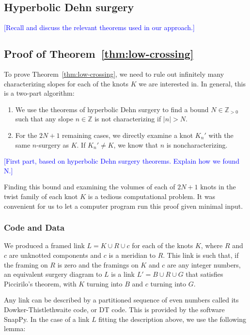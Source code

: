 \documentclass[11pt,usenames,dvipsnames,reqno]{amsart}
\newcommand{\zz}{\mathbb{Z}}
\numberwithin{theorem}{section}
\theoremstyle{ex}
\theoremstyle{rem}
\def\kh#1{\textcolor{Blue}{#1}}
\begin{document}
\subsection{Hyperbolic Dehn surgery} \kh{[Recall and discuss the relevant theorems used in our approach.]}

\subsection{Proof of Theorem~\ref{thm:low-crossing}}

To prove Theorem~\ref{thm:low-crossing}, we need to rule out infinitely many characterizing slopes for each of the knots $K$ we are interested in. In general, this is a two-part algorithm:

\begin{enumerate}
	\item We use the theorems of hyperbolic Dehn surgery to find a bound $N \in \zz_{>0}$ such that any slope $n \in \zz$ is not characterizing if $|n|>N$.
	\item For the $2 N + 1$ remaining cases, we directly examine a knot $K_{n}'$ with the same $n$-surgery as $K$. If $K_{n}' \neq K$, we know that $n$ is noncharacterizing.
\end{enumerate}

\kh{[First part, based on hyperbolic Dehn surgery theorems. Explain how we found N.]}

Finding this bound and examining the volumes of each of $2 N + 1$ knots in the twist family of each knot $K$ is a tedious computational problem. It was convenient for us to let a computer program run this proof given minimal input.

\subsubsection{Code and Data}
We produced a framed link $L = K \cup R \cup c$ for each of the knots $K$, where $R$ and $c$ are unknotted components and $c$ is a meridian to $R$. This link is such that, if the framing on $R$ is zero and the framings on $K$ and $c$ are any integer numbers, an equivalent surgery diagram to $L$ is a link $L' = B \cup R \cup G$ that satisfies Piccirilo's theorem, with $K$ turning into $B$ and $c$ turning into $G$.

Any link can be described by a partitioned sequence of even numbers called its Dowker-Thistlethwaite  code, or DT code. This is provided by the software SnapPy. In the case of a link $L$ fitting the description above, we use the following lemma:
\end{document}
